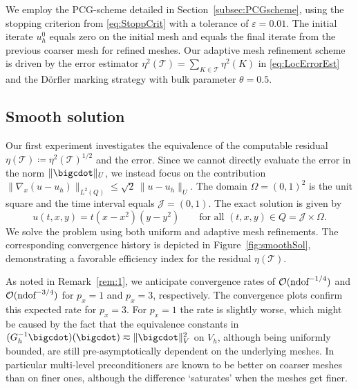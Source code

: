 \documentclass{amsart}
\providecommand{\tria}{\mathcal{T}}
\newcommand{\cJ}{\mathcal J}
\begin{document}
We employ the PCG-scheme detailed in Section~\ref{subsec:PCGscheme}, using the stopping criterion from \eqref{eq:StoppCrit} with a tolerance of $\varepsilon = 0.01$.
The initial iterate $u_h^0$ equals zero on the initial mesh and equals the final iterate from the previous coarser mesh for refined meshes.
Our adaptive mesh refinement scheme is driven by the error estimator $\eta^2(\tria) = \sum_{K\in \tria}\eta^2(K)$ in \eqref{eq:LocErrorEst} and the D\"orfler marking strategy with bulk parameter $\theta = 0.5$.

\subsection{Smooth solution}\label{subsec:ExpSmootSol}
Our first experiment investigates the equivalence of the computable residual $\eta(\tria) \coloneqq \eta^2(\tria)^{1/2}$ and the error. Since we cannot directly evaluate the error in the norm $\lVert \bigcdot \rVert_U$, we instead focus on the contribution $\lVert \nabla_x (u-u_h) \rVert_{L^2(Q)} \leq \sqrt{2}\, \lVert u-u_h \rVert_U$.
The domain $\Omega = (0,1)^2$ is the unit square and the time interval equals $\cJ = (0,1)$. The exact solution is given by
\begin{equation*}
u(t,x,y) = t(x-x^2)(y-y^2) \qquad \text{for all } (t,x,y) \in Q = \cJ \times \Omega.
\end{equation*}
We solve the problem using both uniform and adaptive mesh refinements. The corresponding convergence history is depicted in Figure~\ref{fig:smoothSol}, demonstrating a favorable efficiency index for the residual $\eta(\tria)$.

As noted in Remark~\ref{rem:1}, we anticipate convergence rates of $\mathcal{O}(\textup{ndof}^{-1/4})$ and $\mathcal{O}(\textup{ndof}^{-3/4})$ for $p_x = 1$ and $p_x = 3$, respectively. The convergence plots confirm this expected rate for $p_x=3$. For $p_x=1$ the rate is slightly worse, which might be caused by the fact that the equivalence constants in $(G_h^{-1} \bigcdot)(\bigcdot) \eqsim \|\bigcdot\|_V^2$ on $V_h$, although being uniformly bounded, are still pre-asymptotically dependent on the underlying meshes. In particular multi-level preconditioners are known to be better on coarser meshes than on finer ones, although the difference `saturates' when the meshes get finer. 
\end{document}
